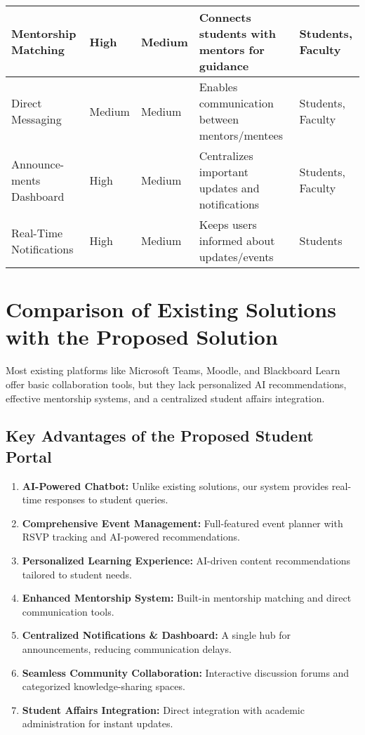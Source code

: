 \begin{longtable}{|L{2cm}|C{2.2cm}|C{2cm}|L{4cm}|L{2.5cm}|}
\hline
Mentorship Matching & High & Medium & Connects students with mentors for guidance & Students, Faculty \\
\hline
Direct Messaging & Medium & Medium & Enables communication between mentors/mentees & Students, Faculty \\
\hline
Announce-ments Dashboard & High & Medium & Centralizes important updates and notifications & Students, Faculty \\
\hline
Real-Time Notifications & High & Medium & Keeps users informed about updates/events & Students \\
\hline
\end{longtable}

\section{Comparison of Existing Solutions with the Proposed Solution}

Most existing platforms like Microsoft Teams, Moodle, and Blackboard Learn offer basic collaboration tools, but they lack personalized AI recommendations, effective mentorship systems, and a centralized student affairs integration.

\subsection*{Key Advantages of the Proposed Student Portal}

\begin{enumerate}
    \item \textbf{AI-Powered Chatbot:} Unlike existing solutions, our system provides real-time responses to student queries.
    \item \textbf{Comprehensive Event Management:} Full-featured event planner with RSVP tracking and AI-powered recommendations.
    \item \textbf{Personalized Learning Experience:} AI-driven content recommendations tailored to student needs.
    \item \textbf{Enhanced Mentorship System:} Built-in mentorship matching and direct communication tools.
    \item \textbf{Centralized Notifications \& Dashboard:} A single hub for announcements, reducing communication delays.
    \item \textbf{Seamless Community Collaboration:} Interactive discussion forums and categorized knowledge-sharing spaces.
    \item \textbf{Student Affairs Integration:} Direct integration with academic administration for instant updates.
\end{enumerate}
